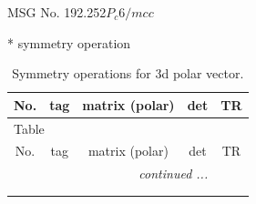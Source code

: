 \documentclass[fleqn,8pt]{jsarticle}
\begin{document}
\setcounter{MaxMatrixCols}{32}

\renewcommand{\tablename}{Table~}
\renewcommand{\figurename}{Figure~}
\begin{center}
\LARGE
MSG No. 192.252\quad$P_{c}6/mcc$
\end{center}
* symmetry operation
\renewcommand{\arraystretch}{1.3}
\begin{longtable}{ccccc}
\caption{Symmetry operations for 3d polar vector.}
 \\
 \hline \hline
No. & tag & matrix (polar) & det & TR \\ \hline \endfirsthead

\multicolumn{4}{l}{\tablename\ \thetable{}} \\
 \hline \hline
No. & tag & matrix (polar) & det & TR \\ \hline \endhead

 \hline \hline
\multicolumn{4}{r}{\footnotesize\it continued ...} \\ \endfoot

 \hline \hline
\multicolumn{4}{r}{} \\ \endlastfoot


\end{longtable}
\end{document}
